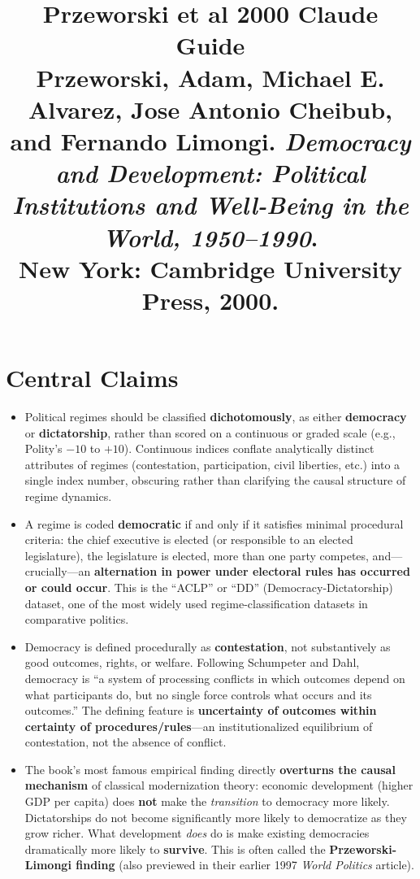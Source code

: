 \documentclass[12pt]{article}
\title{\textbf{Przeworski et al 2000 Claude Guide}\\
\large Przeworski, Adam, Michael E. Alvarez, Jose Antonio Cheibub, and Fernando Limongi. \textit{Democracy and Development: Political Institutions and Well-Being in the World, 1950--1990}.\\
New York: Cambridge University Press, 2000.}
\author{}
\date{}
\begin{document}
\maketitle
\tableofcontents
\newpage

\section{Central Claims}

\begin{itemize}[leftmargin=*, itemsep=4pt]
    \item Political regimes should be classified \textbf{dichotomously}, as either \textbf{democracy} or \textbf{dictatorship}, rather than scored on a continuous or graded scale (e.g., Polity's $-10$ to $+10$). Continuous indices conflate analytically distinct attributes of regimes (contestation, participation, civil liberties, etc.) into a single index number, obscuring rather than clarifying the causal structure of regime dynamics.
    \item A regime is coded \textbf{democratic} if and only if it satisfies minimal procedural criteria: the chief executive is elected (or responsible to an elected legislature), the legislature is elected, more than one party competes, and---crucially---an \textbf{alternation in power under electoral rules has occurred or could occur}. This is the ``ACLP'' or ``DD'' (Democracy-Dictatorship) dataset, one of the most widely used regime-classification datasets in comparative politics.
    \item Democracy is defined procedurally as \textbf{contestation}, not substantively as good outcomes, rights, or welfare. Following Schumpeter and Dahl, democracy is ``a system of processing conflicts in which outcomes depend on what participants do, but no single force controls what occurs and its outcomes.'' The defining feature is \textbf{uncertainty of outcomes within certainty of procedures/rules}---an institutionalized equilibrium of contestation, not the absence of conflict.
    \item The book's most famous empirical finding directly \textbf{overturns the causal mechanism} of classical modernization theory: economic development (higher GDP per capita) does \textbf{not} make the \textit{transition} to democracy more likely. Dictatorships do not become significantly more likely to democratize as they grow richer. What development \textit{does} do is make existing democracies dramatically more likely to \textbf{survive}. This is often called the \textbf{Przeworski-Limongi finding} (also previewed in their earlier 1997 \textit{World Politics} article).

\end{itemize}
\end{document}
